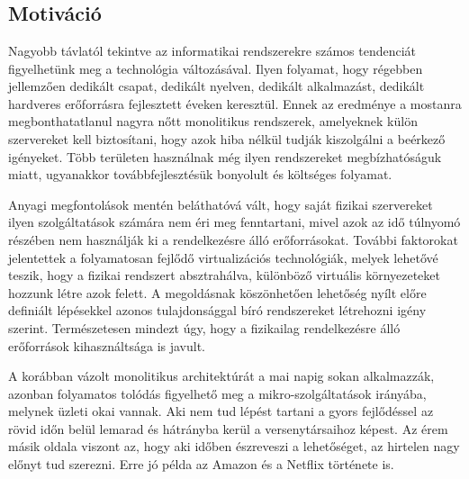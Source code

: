 \chapter{\bevezetes}

\section{Motiváció}

Nagyobb távlatól tekintve az informatikai rendszerekre számos tendenciát figyelhetünk meg a technológia változásával.
Ilyen folyamat, hogy régebben jellemzően dedikált csapat, dedikált nyelven, dedikált alkalmazást, dedikált hardveres erőforrásra fejlesztett éveken keresztül. 
Ennek az eredménye a mostanra megbonthatatlanul nagyra nőtt monolitikus\citep{monoliticAndMicroserviceArchitecture} rendszerek, amelyeknek külön szervereket kell biztosítani, hogy azok hiba nélkül tudják kiszolgálni a beérkező igényeket.
Több területen használnak még ilyen rendszereket megbízhatóságuk miatt, ugyanakkor továbbfejlesztésük bonyolult és költséges folyamat.

Anyagi megfontolások mentén beláthatóvá vált, hogy saját fizikai szervereket ilyen szolgáltatások számára nem éri meg fenntartani, mivel azok az idő túlnyomó részében nem használják ki a rendelkezésre álló erőforrásokat.
További faktorokat jelentettek a folyamatosan fejlődő virtualizációs technológiák, melyek lehetővé teszik, hogy a fizikai rendszert absztrahálva, különböző virtuális környezeteket hozzunk létre azok felett.
A megoldásnak köszönhetően lehetőség nyílt előre definiált lépésekkel azonos tulajdonsággal bíró rendszereket létrehozni igény szerint\citep{infrastuctureAsCode}. 
Természetesen mindezt úgy, hogy a fizikailag rendelkezésre álló erőforrások kihasználtsága is javult.

A korábban vázolt monolitikus architektúrát a mai napig sokan alkalmazzák, azonban folyamatos tolódás figyelhető meg a mikro-szolgáltatások irányába, melynek üzleti okai vannak. 
Aki nem tud lépést tartani a gyors fejlődéssel az rövid időn belül lemarad és hátrányba kerül a versenytársaihoz képest. 
Az érem másik oldala viszont az, hogy aki időben észreveszi a lehetőséget, az hirtelen nagy előnyt tud szerezni. 
Erre jó példa az Amazon\citep{amazon} és a Netflix\citep{netflix} története is.  

